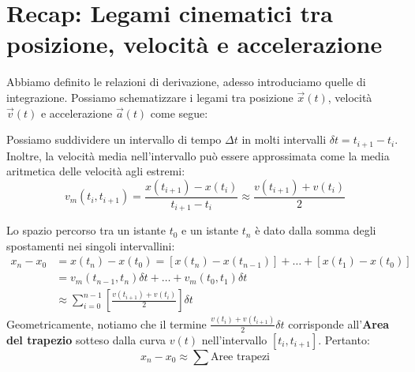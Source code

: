 \section{Recap: Legami cinematici tra posizione, velocità e accelerazione}

Abbiamo definito le relazioni di derivazione, adesso introduciamo quelle di integrazione.
Possiamo schematizzare i legami tra posizione $\vec{x}(t)$, velocità $\vec{v}(t)$ e accelerazione $\vec{a}(t)$ come segue:

\begin{center}
\end{center}

Possiamo suddividere un intervallo di tempo $\Delta t$ in molti intervalli $\delta t = t_{i+1} - t_i$. Inoltre, la velocità media nell'intervallo può essere approssimata come la media aritmetica delle velocità agli estremi:
\begin{equation}
    v_m(t_i, t_{i+1}) = \frac{x(t_{i+1}) - x(t_i)}{t_{i+1} - t_i} \approx \frac{v(t_{i+1}) + v(t_i)}{2}
\end{equation}

Lo spazio percorso tra un istante $t_0$ e un istante $t_n$ è dato dalla somma degli spostamenti nei singoli intervallini:
\begin{align*}
x_n - x_0 &= x(t_n) - x(t_0) = [x(t_n) - x(t_{n-1})] + \dots + [x(t_1) - x(t_0)] \\
&= v_m(t_{n-1}, t_n)\delta t + \dots + v_m(t_0, t_1)\delta t \\
&\approx \sum_{i=0}^{n-1} \left[ \frac{v(t_{i+1}) + v(t_i)}{2} \right] \delta t
\end{align*}
Geometricamente, notiamo che il termine $\frac{v(t_i) + v(t_{i+1})}{2} \delta t$ corrisponde all'\textbf{Area del trapezio} sotteso dalla curva $v(t)$ nell'intervallo $[t_i, t_{i+1}]$.
Pertanto:
\begin{equation}
    x_n - x_0 \approx \sum \text{Aree trapezi}
\end{equation}

